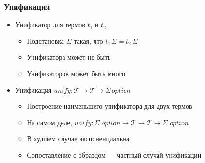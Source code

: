 \documentclass{../../slides-style}
\begin{document}
        \begin{frame}[fragile]
        \frametitle{Унификация}
    \begin{itemize}
        \item Унификатор для термов $t_1$ и $t_2$
         \begin{itemize}
            \item Подстановка $\Sigma$ такая, что $t_1\,\Sigma = t_2\,\Sigma$
            \item Унификатора может не быть
            \item Унификаторов может быть много
        \end{itemize}
        \pause
        \vspace{2mm}
        \item Унификация $unify : \mathcal{T} \rightarrow \mathcal{T} \rightarrow \Sigma\, option$
        \begin{itemize}
            \item Построение наименьшего унификатора для двух термов
            \item На самом деле, $unify : \Sigma\; option \rightarrow \mathcal{T} \rightarrow \mathcal{T}  \rightarrow \Sigma \;option$
            \item В худшем случае экспоненциальна
            \item Сопоставление с образцом --- частный случай унификации
        \end{itemize}
    \end{itemize}
    \end{frame}
\end{document}
